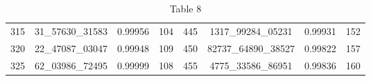 \documentclass[preprint]{sigplanconf}
\begin{document}
\begin{table}
\begin{center}
\begin{tabular}{|c c c c| c c c c|}
            315             & 31\_57630\_31583 & 0.99956          & 104             & 445          & 1317\_99284\_05231  & 0.99931          & 152             \\
            320             & 22\_47087\_03047 & 0.99948          & 109             & 450          & 82737\_64890\_38527 & 0.99822          & 157             \\
            325             & 62\_03986\_72495 & 0.99999          & 108             & 455          & 4775\_33586\_86951  & 0.99836          & 160             \\
            \hline
        \end{tabular}
        \caption{Table 8}
        \label{tab-8}
    \end{center}
\end{table}


\end{document}
